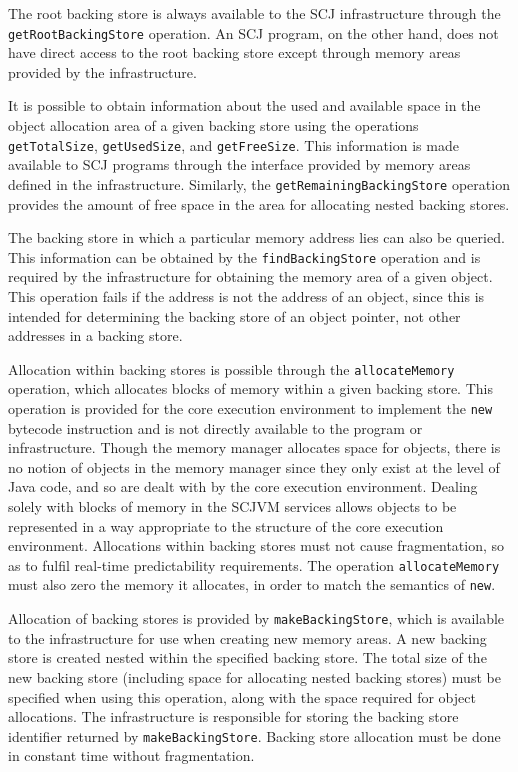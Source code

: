 The root backing store is always available to the SCJ infrastructure
through the \texttt{get\-Root\-Backing\-Store} operation.
An SCJ program, on the other hand, does not have direct access to the
root backing store except through memory areas provided by the
infrastructure.

It is possible to obtain information about the used and available
space in the object allocation area of a given backing store using the
operations \texttt{get\-Total\-Size}, \texttt{get\-Used\-Size}, and
\texttt{get\-Free\-Size}.
This information is made available to SCJ programs through the
interface provided by memory areas defined in the infrastructure.
Similarly, the \texttt{getRemainingBackingStore} operation provides
the amount of free space in the area for allocating nested
backing stores.

The backing store in which a particular memory address lies can also
be queried.
This information can be obtained by the \texttt{find\-Backing\-Store}
operation and is required by the infrastructure for obtaining the
memory area of a given object.
This operation fails if the address is not the address of an object,
since this is intended for determining the backing store of an object
pointer, not other addresses in a backing store.

Allocation within backing stores is possible through the
\texttt{allocate\-Memory} operation, which allocates blocks of memory
within a given backing store.
This operation is provided for the core execution environment to
implement the \texttt{new} bytecode instruction and is not directly
available to the program or infrastructure.
Though the memory manager allocates space for objects, there is no
notion of objects in the memory manager since they only exist at the
level of Java code, and so are dealt with by the core execution
environment. 
Dealing solely with blocks of memory in the SCJVM services allows
objects to be represented in a way appropriate to the structure of the
core execution environment.
Allocations within backing stores must not cause fragmentation, so as
to fulfil real-time predictability requirements.
The operation \texttt{allocate\-Memory} must also zero the memory it
allocates, in order to match the semantics of \texttt{new}.
 
Allocation of backing stores is provided by
\texttt{make\-Backing\-Store}, which is available to the
infrastructure for use when creating new memory areas.
A new backing store is created nested within the specified backing
store.
The total size of the new backing store (including space for
allocating nested backing stores) must be specified when using this
operation, along with the space required for object allocations.
The infrastructure is responsible for storing the backing store
identifier returned by \texttt{make\-Backing\-Store}.
Backing store allocation must be done in constant time without
fragmentation.

